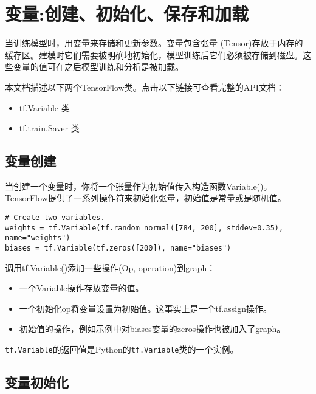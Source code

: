 




\section{变量:创建、初始化、保存和加载}

当训练模型时，用变量来存储和更新参数。变量包含张量 (Tensor)存放于内存的缓存区。建模时它们需要被明确地初始化，模型训练后它们必须被存储到磁盘。这些变量的值可在之后模型训练和分析是被加载。

本文档描述以下两个TensorFlow类。点击以下链接可查看完整的API文档：
\begin{itemize}
  \item tf.Variable 类 %
  \item tf.train.Saver 类 %
\end{itemize}

\subsection {变量创建}

当创建一个变量时，你将一个张量作为初始值传入构造函数Variable()。TensorFlow提供了一系列操作符来初始化张量，初始值是常量或是随机值。

\begin{lstlisting}
# Create two variables.
weights = tf.Variable(tf.random_normal([784, 200], stddev=0.35), name="weights")
biases = tf.Variable(tf.zeros([200]), name="biases")
\end{lstlisting}

调用tf.Variable()添加一些操作(Op, operation)到graph：
\begin{itemize}
  \item 一个Variable操作存放变量的值。
  \item 一个初始化op将变量设置为初始值。这事实上是一个tf.assign操作。
  \item 初始值的操作，例如示例中对biases变量的zeros操作也被加入了graph。
\end{itemize}
\lstinline{tf.Variable}的返回值是Python的\lstinline{tf.Variable}类的一个实例。

\subsection {变量初始化}

